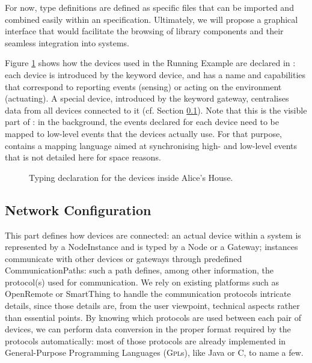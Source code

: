 For now, type definitions are defined as specific files that can be imported and combined easily within an \IOT specification. Ultimately, we will propose a graphical interface that would facilitate the browsing of library components and their seamless integration into \IOT systems.

Figure \ref{fig:RE-Typing} shows how the devices used in the Running Example are declared in \IOTDSL: each device is introduced by the keyword \textsf{device}, and has a name and capabilities that correspond to reporting events (\textsf{sensing}) or acting on the environment (\textsf{actuating}). A special device, introduced by the keyword \textsf{gateway}, centralises data from all devices connected to it (cf. Section \ref{sec:IoTDSL-NetworkConfiguration}). Note that this is the visible part of \IOTDSL: in the background, the events declared for each device need to be mapped to low-level events that the devices actually use. For that purpose, \IOTDSL contains a mapping language aimed at synchronising high- and low-level events that is not detailed here for space reasons.

\begin{figure}[t]%
\caption{Typing declaration for the devices inside Alice's House.}%
\label{fig:RE-Typing}%
\end{figure}	
	
\subsection{Network Configuration}
\label{sec:IoTDSL-NetworkConfiguration}

This part defines how devices are connected: an actual device within a system is represented by a \textsf{NodeInstance} and is typed by a \textsf{Node} or a \textsf{Gateway}; instances communicate with other \IOT devices or gateways through predefined \textsf{CommunicationPath}s: such a path defines, among other information, the protocol(s) used for communication. We rely on existing platforms such as OpenRemote or SmartThing to handle the communication protocols intricate details, since those details are, from the user viewpoint, technical aspects rather than essential points. By knowing which protocols are used between each pair of devices, we can perform data conversion in the proper format required by the protocols automatically: most of those protocols are already implemented in General-Purpose Programming Languages (\textsc{Gpl}s), like Java or C, to name a few.
	
